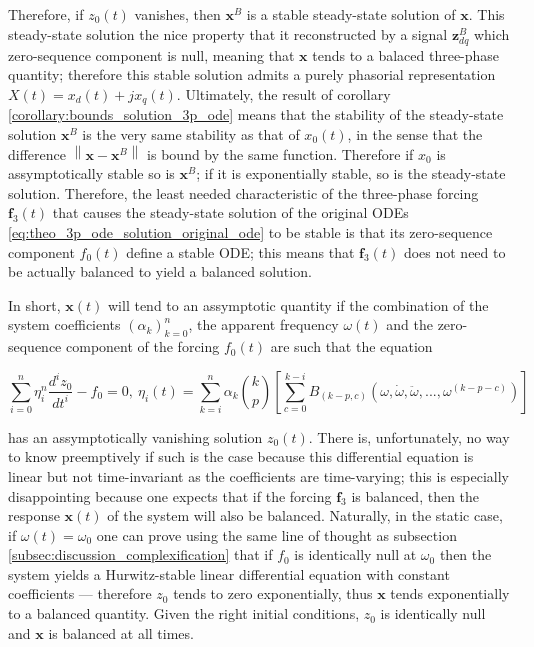 	Therefore, if $z_0(t)$ vanishes, then $\mathbf{x}^B$ is a stable steady-state solution of $\mathbf{x}$. This steady-state solution the nice property that it reconstructed by a signal $\mathbf{z}_{dq}^B$ which zero-sequence component is null, meaning that $\mathbf{x}$ tends to a balaced three-phase quantity; therefore this stable solution admits a purely phasorial representation $X(t) = x_d(t) + jx_q(t)$. Ultimately, the result of corollary \ref{corollary:bounds_solution_3p_ode} means that the stability of the steady-state solution $\mathbf{x}^B$ is the very same stability as that of $x_0(t)$, in the sense that the difference $\left\lVert \mathbf{x} - \mathbf{x}^B\right\rVert$ is bound by the same function. Therefore if $x_0$ is assymptotically stable so is $\mathbf{x}^B$; if it is exponentially stable, so is the steady-state solution. Therefore, the least needed characteristic of the three-phase forcing $\mathbf{f}_3(t)$ that causes the steady-state solution of the original ODEs \eqref{eq:theo_3p_ode_solution_original_ode} to be stable is that its zero-sequence component $f_0(t)$ define a stable ODE; this means that $\mathbf{f}_3(t)$ does not need to be actually balanced to yield a balanced solution.

	In short, $\mathbf{x}(t)$ will tend to an assymptotic quantity if the combination of the system coefficients $\left(\alpha_k\right)_{k=0}^n$, the apparent frequency $\omega(t)$ and the zero-sequence component of the forcing $f_0(t)$ are such that the equation

\begin{equation}
	\sum\limits_{i=0}^n \eta_i^n \dfrac{d^i z_0}{dt^i} - f_0 = 0,\ \eta_i(t) = \sum\limits_{k=i}^{n} \alpha_k {k\choose p} \left[\sum\limits_{c=0}^{k-i} B_{\left(k-p,c\right)}\left(\omega,\dot{\omega},\ddot{\omega},...,\omega^{(k-p-c)}\right)\right] \label{eq:3p_zeroseq_ode}
\end{equation}

	\noindent has an assymptotically vanishing solution $z_0(t)$. There is, unfortunately, no way to know preemptively if such is the case because this differential equation is linear but not time-invariant as the coefficients are time-varying; this is especially disappointing because one expects that if the forcing $\mathbf{f}_3$ is balanced, then the response $\mathbf{x}(t)$ of the system will also be balanced. Naturally, in the static case, if $\omega(t) = \omega_0$ one can prove using the same line of thought as subsection \ref{subsec:discussion_complexification} that if $f_0$ is identically null at $\omega_0$ then the system yields a Hurwitz-stable linear differential equation with constant coefficients — therefore $z_0$ tends to zero exponentially, thus $\mathbf{x}$ tends exponentially to a balanced quantity. Given the right initial conditions, $z_0$ is identically null and $\mathbf{x}$ is balanced at all times.	

